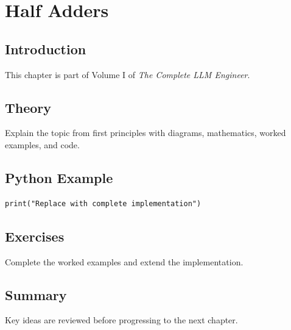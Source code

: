 \chapter{Half Adders}
\label{chap:half-adders}



\section{Introduction}
This chapter is part of Volume I of \emph{The Complete LLM Engineer}.

\section{Theory}
Explain the topic from first principles with diagrams, mathematics, worked examples,
and code.

\section{Python Example}
\begin{lstlisting}
print("Replace with complete implementation")
\end{lstlisting}

\section{Exercises}
\begin{exercise}
Complete the worked examples and extend the implementation.
\end{exercise}

\section{Summary}
Key ideas are reviewed before progressing to the next chapter.
